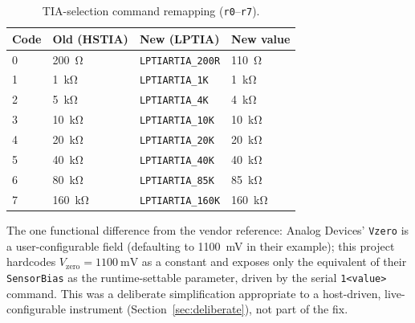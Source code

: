 \begin{table}[h]
\centering
\footnotesize
\setlength{\tabcolsep}{4pt}
\caption{TIA-selection command remapping (\texttt{r0}--\texttt{r7}).}
\label{tab:rtia}
\begin{tabular}{@{}p{0.9cm}p{2.3cm}p{2.6cm}p{1.7cm}@{}}
\toprule
Code & Old (HSTIA) & New (LPTIA) & New value \\
\midrule
0 & \SI{200}{\ohm}   & \texttt{LPTIARTIA\_200R} & \SI{110}{\ohm} \\
1 & \SI{1}{\kilo\ohm}  & \texttt{LPTIARTIA\_1K}   & \SI{1}{\kilo\ohm} \\
2 & \SI{5}{\kilo\ohm}  & \texttt{LPTIARTIA\_4K}   & \SI{4}{\kilo\ohm} \\
3 & \SI{10}{\kilo\ohm} & \texttt{LPTIARTIA\_10K}  & \SI{10}{\kilo\ohm} \\
4 & \SI{20}{\kilo\ohm} & \texttt{LPTIARTIA\_20K}  & \SI{20}{\kilo\ohm} \\
5 & \SI{40}{\kilo\ohm} & \texttt{LPTIARTIA\_40K}  & \SI{40}{\kilo\ohm} \\
6 & \SI{80}{\kilo\ohm} & \texttt{LPTIARTIA\_85K}  & \SI{85}{\kilo\ohm} \\
7 & \SI{160}{\kilo\ohm}& \texttt{LPTIARTIA\_160K} & \SI{160}{\kilo\ohm} \\
\bottomrule
\end{tabular}
\end{table}

The one functional difference from the vendor reference: Analog Devices'
\texttt{Vzero} is a user-configurable field (defaulting to \SI{1100}{\milli\volt}
in their example); this project hardcodes $V_{\mathrm{zero}}=\SI{1100}{\milli\volt}$
as a constant and exposes only the equivalent of their \texttt{SensorBias}
as the runtime-settable parameter, driven by the serial \texttt{1<value>}
command. This was a deliberate simplification appropriate to a
host-driven, live-configurable instrument (Section~\ref{sec:deliberate}),
not part of the fix.

